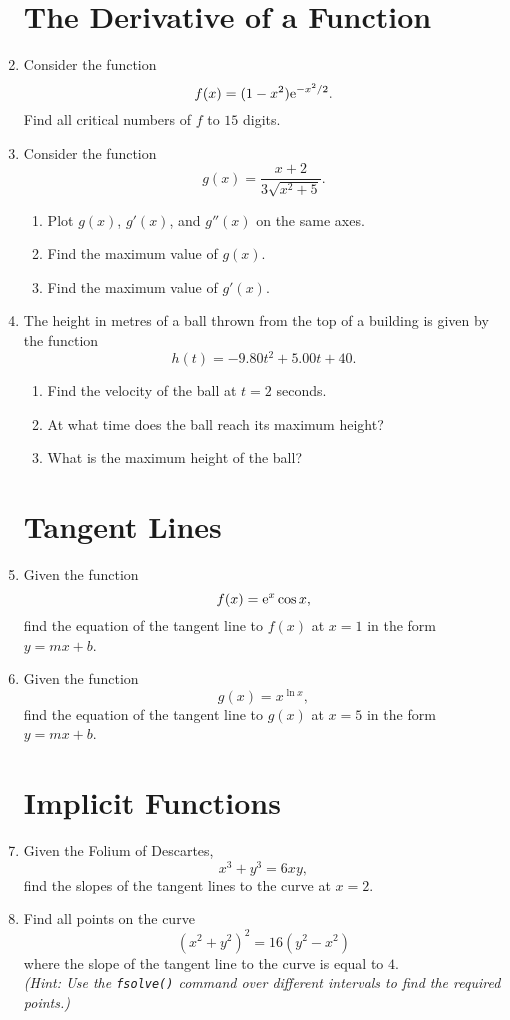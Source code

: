 \begin{enumerate}
\section*{The Derivative of a Function}

\item Consider the function \[ f(x) = (1-x^2) {\rm e}^{-x^2/2}. \] Find all critical numbers of $f$ to $15$ digits.
\item Consider the function \[ g(x) = \frac{x+2}{3\sqrt{x^2+5}}. \]
	\begin{enumerate}
	\item Plot $g(x)$, $g'(x)$, and $g''(x)$ on the same axes.
	\item Find the maximum value of $g(x)$.
	\item Find the maximum value of $g'(x)$.
	\end{enumerate}
\item The height in metres of a ball thrown from the top of a building is given by the function
\[ h(t) = -9.80t^2 + 5.00t + 40. \]
	\begin{enumerate}
	\item Find the velocity of the ball at $t=2$ seconds.
	\item At what time does the ball reach its maximum height?
	\item What is the maximum height of the ball?
	\end{enumerate}

\section*{Tangent Lines}

\item Given the function \[ f(x) = {\rm e}^x \cos x, \] find the equation of the tangent line to $f(x)$ at $x=1$ in the form $y = mx + b$.
\item Given the function \[ g(x) = x^{\ln x}, \] find the equation of the tangent line to $g(x)$ at $x=5$ in the form $y = mx + b$.

\section*{Implicit Functions}

\item Given the Folium of Descartes,
\[ x^3 + y^3 = 6xy, \]
find the slopes of the tangent lines to the curve at $x=2$.
\item Find all points on the curve
\[ (x^2+y^2)^2 = 16(y^2-x^2) \]
where the slope of the tangent line to the curve is equal to $4$.\\
\textit{(Hint: Use the \texttt{fsolve()} command over different intervals to find the required points.)}
\end{enumerate}

